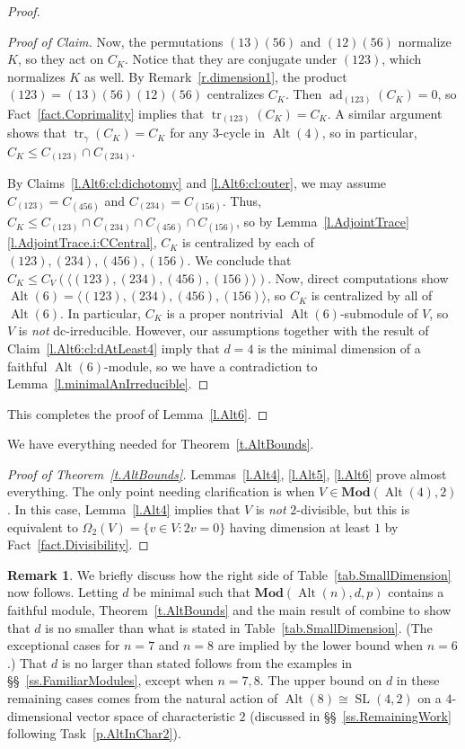 \documentclass[a4paper, 11pt]{amsart}
\theoremstyle{plain}
\theoremstyle{definition}
\newtheorem{remark}[theorem]{Remark}
\theoremstyle{remark}
\newenvironment{proofclaim}[1][Proof of Claim]{\begin{proof}[#1]\renewcommand{\qedsymbol}{$\lozenge$}}{\end{proof}}
\DeclareMathOperator{\ad}{ad}
\DeclareMathOperator{\tr}{tr}
\DeclareMathOperator{\Alt}{Alt}
\DeclareMathOperator{\SL}{SL}
\newcommand{\Mod}{\mathbf{Mod}}
\begin{document}
\begin{proof}
\begin{proofclaim}
Now, the permutations $(13)(56)$ and $(12)(56)$ normalize $K$, so they act on $C_{K}$.
Notice that they are conjugate under $(123)$, which normalizes $K$ as well.
By Remark~\ref{r.dimension1}, the product $(123) = (13)(56)(12)(56)$ centralizes $C_{K}$.
Then $\ad_{(123)}(C_{K}) = 0$, so Fact~\ref{fact.Coprimality} implies that $\tr_{(123)}(C_{K}) = C_{K}$. A similar argument shows that $\tr_{\gamma}(C_{K}) = C_{K}$ for any $3$-cycle in $\Alt(4)$, so in particular, $C_K \le C_{(123)} \cap C_{(234)}$. 

By Claims~\ref{l.Alt6:cl:dichotomy} and \ref{l.Alt6:cl:outer}, we may assume  $C_{(123)} = C_{(456)}$ and $C_{(234)} = C_{(156)}$. Thus, $C_K \le C_{(123)} \cap C_{(234)} \cap C_{(456)} \cap C_{(156)}$, so by Lemma~\ref{l.AdjointTrace}\eqref{l.AdjointTrace.i:CCentral}, $C_K$ is centralized by each of $(123),(234),(456),(156)$. We conclude that $C_K \le C_V(\langle (123),(234),(456),(156) \rangle)$. Now, direct computations show  $ \Alt(6)= \langle (123),(234),(456),(156) \rangle $, so $C_K$ is centralized by all of $\Alt(6)$. In particular, $C_K$ is a proper nontrivial $\Alt(6)$-submodule of $V$, so $V$ is \emph{not} dc-irreducible. However, our assumptions together with the result of Claim~\ref{l.Alt6:cl:dAtLeast4} imply that  $d=4$ is the minimal dimension of a faithful $\Alt(6)$-module, so we have a contradiction to Lemma~\ref{l.minimalAnIrreducible}.
\end{proofclaim}
This completes the proof of Lemma~\ref{l.Alt6}.
\end{proof}\setcounter{claim}{0}

We have everything needed for Theorem~\ref{t.AltBounds}.

\begin{proof}[Proof of Theorem~\ref{t.AltBounds}]
Lemmas~\ref{l.Alt4}, \ref{l.Alt5},  \ref{l.Alt6} prove almost everything. The only point needing clarification is when $V\in\Mod(\Alt(4),2)$. In this case, Lemma~\ref{l.Alt4} implies that $V$ is \emph{not} $2$-divisible, but this is equivalent to $\Omega_2(V) = \{v \in V: 2v = 0\}$ having dimension at least $1$ by Fact~\ref{fact.Divisibility}.
\end{proof}

\begin{remark}\label{r.ProofOfTable}
We briefly discuss how the right side of Table~\ref{tab.SmallDimension} now follows. 
Letting $d$ be minimal such that $\Mod(\Alt(n),d,p)$ contains a faithful module, Theorem~\ref{t.AltBounds} and the main result of \cite{CDW23} combine to show that $d$ is no smaller than what is stated in Table~\ref{tab.SmallDimension}. (The exceptional cases for $n=7$ and $n=8$ are implied by the lower bound when $n=6$.) That $d$ is no larger than stated follows from the examples in \S\S~\ref{ss.FamiliarModules}, except when $n=7,8$. The upper bound on $d$ in these remaining cases comes from the natural action of $\Alt(8)\cong \SL(4,2)$ on a $4$-dimensional vector space of characteristic $2$ (discussed in \S\S~\ref{ss.RemainingWork} following Task~\ref{p.AltInChar2}).
\end{remark}
\end{document}

